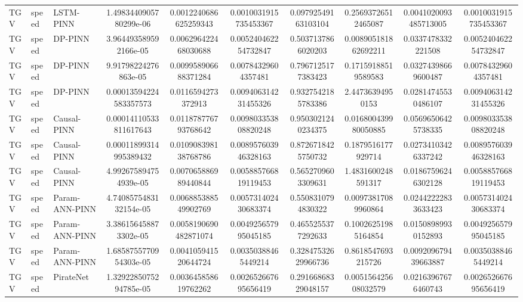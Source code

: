 \begin{landscape}
\begin{longtable}{lllccccccc}
 TGV & speed &      LSTM-PINN & 1.4983440905780299e-06 &  0.0012240686625259343 &  0.0010031915735453367 &  0.09792549163103104 &   0.25693726512465087 & 0.0041020093485713005 &  0.0010031915735453367 \\
 TGV & speed &        DP-PINN &  3.964493589592166e-05 &   0.006296422468030688 &   0.005240462254732847 &   0.5037137866020203 &  0.008905181862692211 &    0.0337478332221508 &   0.005240462254732847 \\
 TGV & speed &        DP-PINN &   9.91798224276863e-05 &   0.009958906688371284 &    0.00784329604357481 &   0.7967125177383423 &   0.17159188519589583 &   0.03274398669600487 &    0.00784329604357481 \\
 TGV & speed &        DP-PINN & 0.00013594224583357573 &     0.0116594273372913 &   0.009406314231455326 &   0.9327542185783386 &      2.44736394950153 &   0.02814745530486107 &   0.009406314231455326 \\
 TGV & speed &    Causal-PINN & 0.00014110533811617643 &   0.011878776793768642 &   0.009803353808820248 &   0.9503021240234375 &  0.016800439980050885 &   0.05696506425738335 &   0.009803353808820248 \\
 TGV & speed &    Causal-PINN & 0.00011899314995389432 &   0.010908398138768786 &   0.008957603946328163 &   0.8726718425750732 &    0.1879516177929714 &   0.02734103426337242 &   0.008957603946328163 \\
 TGV & speed &    Causal-PINN &  4.992675894754939e-05 &   0.007065886989440844 &   0.005885766819119453 &   0.5652709603309631 &    1.4831600248591317 &   0.01867596246302128 &   0.005885766819119453 \\
 TGV & speed & Param-ANN-PINN & 4.7408575483132154e-05 &   0.006885388549902769 &   0.005731402430683374 &   0.5508310794830322 &   0.00973817089960864 &   0.02442222833633423 &   0.005731402430683374 \\
 TGV & speed & Param-ANN-PINN &  3.386156458873302e-05 &  0.0058190690482871074 &   0.004925657995045185 &   0.4655255377292633 &   0.10026251985164854 &   0.01508989930152893 &   0.004925657995045185 \\
 TGV & speed & Param-ANN-PINN & 1.6858755770954303e-05 &   0.004105941520644724 &    0.00350388465449214 &  0.32847532629966736 &    0.8618547693215726 &  0.009209679439663887 &    0.00350388465449214 \\
 TGV & speed &      PirateNet & 1.3292285075294785e-05 &   0.003645858619762262 &   0.002652667695656419 &  0.29166868329048157 &  0.005156425608032579 &   0.02163967676460743 &   0.002652667695656419 \\

\end{longtable}
\end{landscape}
